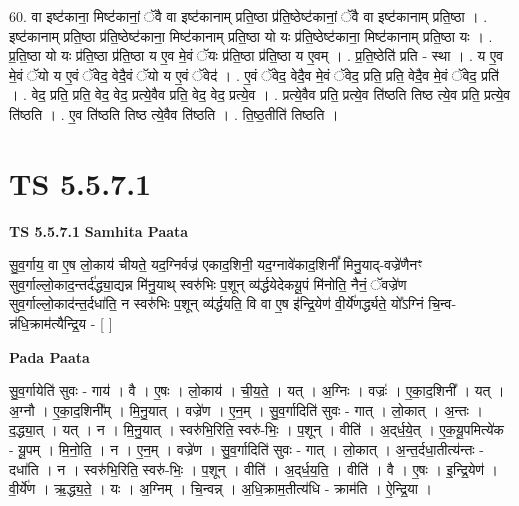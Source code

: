 \documentclass[17pt]{extarticle}
\begin{document}
60. वा इष्ट॑काना॒ मिष्ट॑कानां॒ ॅवै वा इष्ट॑कानाम् प्रति॒ष्ठा प्र॑ति॒ष्ठेष्ट॑कानां॒ ॅवै वा इष्ट॑कानाम् प्रति॒ष्ठा । . इष्ट॑कानाम् प्रति॒ष्ठा प्र॑ति॒ष्ठेष्ट॑काना॒ मिष्ट॑कानाम् प्रति॒ष्ठा यो यः प्र॑ति॒ष्ठेष्ट॑काना॒ मिष्ट॑कानाम् प्रति॒ष्ठा यः । . प्र॒ति॒ष्ठा यो यः प्र॑ति॒ष्ठा प्र॑ति॒ष्ठा य ए॒व मे॒वं ॅयः प्र॑ति॒ष्ठा प्र॑ति॒ष्ठा य ए॒वम् । . प्र॒ति॒ष्ठेति॑ प्रति - स्था । . य ए॒व मे॒वं ॅयो य ए॒वं ॅवेद॒ वेदै॒वं ॅयो य ए॒वं ॅवेद॑ । . ए॒वं ॅवेद॒ वेदै॒व मे॒वं ॅवेद॒ प्रति॒ प्रति॒ वेदै॒व मे॒वं ॅवेद॒ प्रति॑ । . वेद॒ प्रति॒ प्रति॒ वेद॒ वेद॒ प्रत्ये॒वैव प्रति॒ वेद॒ वेद॒ प्रत्ये॒व । . प्रत्ये॒वैव प्रति॒ प्रत्ये॒व ति॑ष्ठति तिष्ठ त्ये॒व प्रति॒ प्रत्ये॒व ति॑ष्ठति । . ए॒व ति॑ष्ठति तिष्ठ त्ये॒वैव ति॑ष्ठति । . ति॒ष्ठ॒तीति॑ तिष्ठति । \newline
\pagebreak
{}

\section{ TS 5.5.7.1 }

\textbf{TS 5.5.7.1 } \newline
\textbf{Samhita Paata} \newline

सु॒व॒र्गाय॒ वा ए॒ष लो॒काय॑ चीयते॒ यद॒ग्निर्वज्र॑ एकाद॒शिनी॒ यद॒ग्नावे॑काद॒शिनीं᳚ मिनु॒याद्-वज्रे॑णैनꣳ सुव॒र्गाल्लो॒काद॒न्तर्द॑द्ध्या॒द्यन्न मि॑नु॒याथ् स्वरु॑भिः प॒शून् व्य॑र्द्धयेदेकयू॒पं मि॑नोति॒ नैनं॒ ॅवज्रे॑ण सुव॒र्गाल्लो॒काद॑न्त॒र्दधा॑ति॒ न स्वरु॑भिः प॒शून् व्य॑र्द्धयति॒ वि वा ए॒ष इ॑न्द्रि॒येण॑ वी॒र्ये॑णर्द्ध्यते॒ यो᳚ऽग्निं चि॒न्व-न्न॑धि॒क्राम॑त्यैन्द्रि॒य - [  ] \newline

\textbf{Pada Paata} \newline

सु॒व॒र्गायेति॑ सुवः - गाय॑ । वै । ए॒षः । लो॒काय॑ । ची॒य॒ते॒ । यत् । अ॒ग्निः । वज्रः॑ । ए॒का॒द॒शिनी᳚ । यत् । अ॒ग्नौ । ए॒का॒द॒शिनी᳚म् । मि॒नु॒यात् । वज्रे॑ण । ए॒न॒म् । सु॒व॒र्गादिति॑ सुवः - गात् । लो॒कात् । अ॒न्तः । द॒द्ध्या॒त् । यत् । न । मि॒नु॒यात् । स्वरु॑भि॒रिति॒ स्वरु॑-भिः॒ । प॒शून् । वीति॑ । अ॒द्‌र्ध॒ये॒त् । ए॒क॒यू॒पमित्ये॑क - यू॒पम् । मि॒नो॒ति॒ । न । ए॒न॒म् । वज्रे॑ण । सु॒व॒र्गादिति॑ सुवः - गात् । लो॒कात् । अ॒न्त॒र्दधा॒तीत्य॑न्तः - दधा॑ति । न । स्वरु॑भि॒रिति॒ स्वरु॑-भिः॒ । प॒शून् । वीति॑ । अ॒द्‌र्ध॒य॒ति॒ । वीति॑ । वै । ए॒षः । इ॒न्द्रि॒येण॑ । वी॒र्ये॑ण । ऋ॒द्ध्य॒ते॒ । यः । अ॒ग्निम् । चि॒न्वन्न् । अ॒धि॒क्राम॒तीत्य॑धि - क्राम॑ति । ऐ॒न्द्रि॒या ।  \newline
\end{document}

